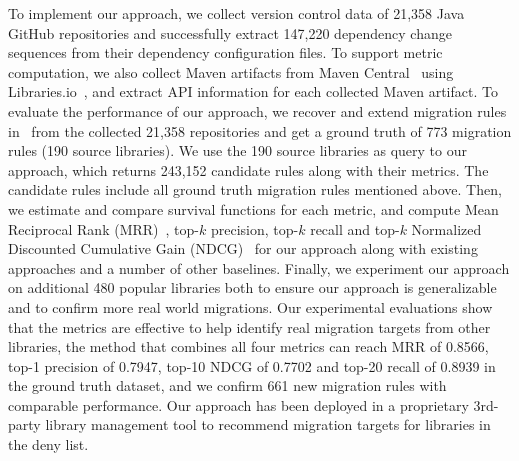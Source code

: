 \documentclass[conference, 10pt]{IEEEtran}
\begin{document}
To implement our approach, we collect version control data of 21,358 Java GitHub repositories %
and successfully extract 147,220 dependency change sequences from their dependency configuration files.
To support metric computation, we also collect Maven artifacts from Maven Central~\cite{Maven} using Libraries.io~\cite{LibrariesIO}, and extract API information for each collected Maven artifact. 
To evaluate the performance of our approach, we recover and extend migration rules in~\cite{2014JournalOfSysAndSoft-Teyton-Study} from the collected 21,358 repositories and get %
a ground truth of 773 migration rules (190 source libraries).
We use the 190 source libraries as query to our approach, which returns 243,152 candidate rules along with their metrics. The candidate rules include all ground truth migration rules mentioned above.
Then, we estimate and compare survival functions for each metric, and compute Mean Reciprocal Rank (MRR)~\cite{Craswell2009MRR}, top-$k$ precision, top-$k$ recall and top-$k$ Normalized Discounted Cumulative Gain (NDCG)~\cite{2002-NDCG} for our approach along with existing approaches and a number of other baselines.
Finally, we experiment our approach on additional 480 popular libraries both to ensure our approach is generalizable and to confirm more real world migrations.
Our experimental evaluations show that the metrics are effective to help identify real migration targets from other libraries, the method that combines all four metrics can reach MRR of 0.8566, top-1 precision of 0.7947, top-10 NDCG of 0.7702 and top-20 recall of 0.8939 in the ground truth dataset, and we confirm 661 new migration rules with comparable performance.
Our approach has been deployed in a proprietary 3rd-party library management tool to recommend migration targets for libraries in the deny list.
\end{document}
